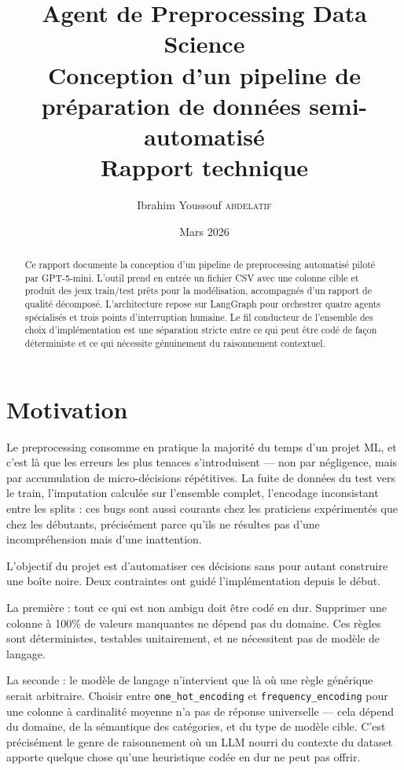 \documentclass[12pt,a4paper]{article}
\title{
  \vspace{-1cm}
  \Large\textbf{Agent de Preprocessing Data Science}\\[0.4cm]
  \large Conception d'un pipeline de préparation de données semi-automatisé\\[0.6cm]
  \normalsize Rapport technique
}
\author{Ibrahim Youssouf \textsc{abdelatif}}
\date{Mars 2026}
\begin{document}
\maketitle
\thispagestyle{empty}

\vspace{0.5cm}

\begin{abstract}
Ce rapport documente la conception d'un pipeline de preprocessing automatisé piloté
par GPT-5-mini. L'outil prend en entrée un fichier CSV avec une colonne cible et
produit des jeux train/test prêts pour la modélisation, accompagnés d'un rapport de
qualité décomposé. L'architecture repose sur LangGraph pour orchestrer quatre agents
spécialisés et trois points d'interruption humaine. Le fil conducteur de l'ensemble
des choix d'implémentation est une séparation stricte entre ce qui peut être codé
de façon déterministe et ce qui nécessite génuinement du raisonnement contextuel.
\end{abstract}
\newpage
\vspace{0.5cm}
\tableofcontents
\newpage

\section{Motivation}

Le preprocessing consomme en pratique la majorité du temps d'un projet ML, et c'est
là que les erreurs les plus tenaces s'introduisent --- non par négligence, mais par
accumulation de micro-décisions répétitives. La fuite de données du test vers le train,
l'imputation calculée sur l'ensemble complet, l'encodage inconsistant entre les splits :
ces bugs sont aussi courants chez les praticiens expérimentés que chez les débutants,
précisément parce qu'ils ne résultes pas d'une incompréhension mais d'une inattention.

L'objectif du projet est d'automatiser ces décisions sans pour autant construire une
boîte noire. Deux contraintes ont guidé l'implémentation depuis le début.

La première : tout ce qui est non ambigu doit être codé en dur. Supprimer une colonne
à 100\% de valeurs manquantes ne dépend pas du domaine. Ces règles sont déterministes,
testables unitairement, et ne nécessitent pas de modèle de langage.

La seconde : le modèle de langage n'intervient que là où une règle générique serait
arbitraire. Choisir entre \texttt{one\_hot\_encoding} et \texttt{frequency\_encoding}
pour une colonne à cardinalité moyenne n'a pas de réponse universelle --- cela dépend
du domaine, de la sémantique des catégories, et du type de modèle cible. C'est
précisément le genre de raisonnement où un LLM nourri du contexte du dataset apporte
quelque chose qu'une heuristique codée en dur ne peut pas offrir.
\end{document}
